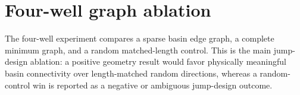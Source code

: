 \section{Four-well graph ablation}
The four-well experiment compares a sparse basin edge graph, a complete minimum graph, and a random matched-length control. This is the main jump-design ablation: a positive geometry result would favor physically meaningful basin connectivity over length-matched random directions, whereas a random-control win is reported as a negative or ambiguous jump-design outcome.
